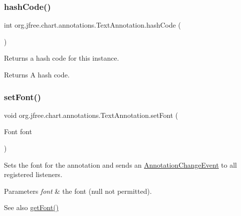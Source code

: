 \subsubsection{\texorpdfstring{hash\+Code()}{hashCode()}}
{\footnotesize\ttfamily int org.\+jfree.\+chart.\+annotations.\+Text\+Annotation.\+hash\+Code (\begin{DoxyParamCaption}{ }\end{DoxyParamCaption})}

Returns a hash code for this instance.

\begin{DoxyReturn}{Returns}
A hash code. 
\end{DoxyReturn}
\mbox{\label{classorg_1_1jfree_1_1chart_1_1annotations_1_1_text_annotation_a28b229e51ba0570b868db3c79f326d23}} 
\subsubsection{\texorpdfstring{set\+Font()}{setFont()}}
{\footnotesize\ttfamily void org.\+jfree.\+chart.\+annotations.\+Text\+Annotation.\+set\+Font (\begin{DoxyParamCaption}\item[{Font}]{font }\end{DoxyParamCaption})}

Sets the font for the annotation and sends an \mbox{\hyperlink{}{Annotation\+Change\+Event}} to all registered listeners.


\begin{DoxyParams}{Parameters}
{\em font} & the font ({\ttfamily null} not permitted).\\
\hline
\end{DoxyParams}
\begin{DoxySeeAlso}{See also}
\mbox{\hyperlink{classorg_1_1jfree_1_1chart_1_1annotations_1_1_text_annotation_aea2ca0640ab40720ec3610f5422b137c}{get\+Font()}} 
\end{DoxySeeAlso}
\mbox{\label{classorg_1_1jfree_1_1chart_1_1annotations_1_1_text_annotation_add0e38c4b928b8442d789f69f81beef1}} 
